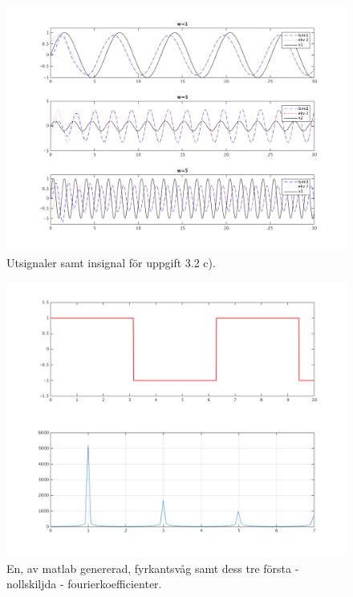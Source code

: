 \begin{figure}
    \label{fig:task2c-three-waves}
    \caption{Utsignaler samt insignal för uppgift 3.2 c).}
    \centering
    \includegraphics[scale=0.55]{figures/task2c-three-waves.png}
\end{figure}

\begin{figure}
    \label{fig:task3c-square-+-fk}
    \caption{En, av matlab genererad, fyrkantsvåg samt dess tre första -
        nollskiljda - fourierkoefficienter.}
    \centering
    \includegraphics[scale=0.55]{figures/task3c-square-+-fk.png}
\end{figure}

